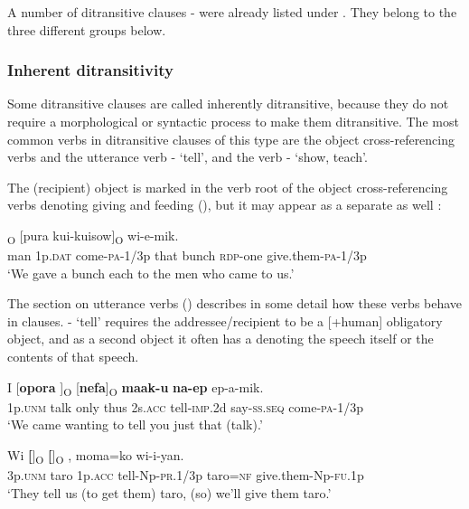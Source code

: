 A number of ditransitive clauses - were already listed under . They belong to the three different groups below.

\subsubsection[Inherent ditransitivity ]{Inherent ditransitivity} \label{sec:5.3.2.1} 

Some  ditransitive clauses are called inherently ditransitive, because they do not require a morphological or syntactic process to make them ditransitive. The most common verbs in ditransitive clauses of this type are the object cross-referencing verbs and the utterance verb - `tell', and the verb - `show, teach'.

The (recipient) object is marked in the verb root of the object cross-referencing verbs denoting giving and feeding (), but it may appear as a separate  as well :

\ea%
\label{ex:5:x950}
\textsubscript{O}  [pura  kui-kuisow]\textsubscript{O} wi-e-mik. \\
     man  1p.\textsc{dat}  come-\textsc{pa}-1/3p  that  bunch  \textsc{rdp}-one give.them-\textsc{pa}-1/3p \\
\glt `We gave a bunch each to the men who came to us.'
\z

The section on utterance verbs () describes in some detail how these verbs behave in clauses. - `tell' requires the addressee/recipient to be a [+human] obligatory object, and as a second object it often has a  denoting the speech itself or the contents of that speech. 

\ea%
\label{ex:5:x1839}
\gll I  [\textbf{opora}  ]\textsubscript{O}  [\textbf{nefa}]\textsubscript{O} \textbf{maak-u} \textbf{na-ep} ep-a-mik. \\
     1p.\textsc{unm}  talk  only  thus  2s.\textsc{acc}  tell-\textsc{imp}.2d  say-\textsc{ss}.\textsc{seq} come-\textsc{pa}-1/3p \\
\glt `We came wanting to tell you just that (talk).'
\z

\ea%
\label{ex:5:x955}
\gll Wi  \textbf{[}]\textsubscript{O}  \textbf{[}]\textsubscript{O}  ,  moma=ko wi-i-yan. \\
     3p.\textsc{unm}  taro  1p.\textsc{acc}  tell-Np-\textsc{pr}.1/3p  taro=\textsc{nf} give.them-Np-\textsc{fu}.1p \\
\glt `They tell us (to get them) taro, (so) we'll give them taro.'
\z

